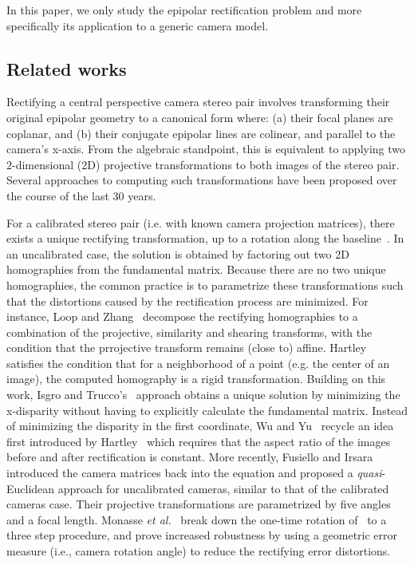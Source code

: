 \documentclass{ipol}
\begin{document}
\noindent In this paper, we only study  the epipolar rectification problem and more specifically
its application to a generic camera model.%

\subsection{Related works}
Rectifying a central perspective camera stereo pair involves transforming their original epipolar geometry to a canonical form where: (a) their focal planes are coplanar, and (b) their conjugate epipolar lines are colinear, and parallel to the camera's x-axis. 
From the algebraic standpoint, this is equivalent to applying two $2$-dimensional ($2$D) projective transformations to both images of the stereo pair. Several approaches to computing such transformations have been proposed over the course of the last 30 years.

For a calibrated stereo pair (i.e. with known camera projection matrices), there exists a unique rectifying transformation, up to a rotation along the baseline~\cite{fusiello2000epi}. In an uncalibrated case, the solution is obtained by factoring out two 2D homographies from the fundamental matrix. Because there are no two unique homographies, the common practice is to parametrize these transformations such that the distortions caused by the rectification process are minimized. For instance, Loop and Zhang~\cite{loop1999epi} decompose the rectifying homographies to a combination of the projective, similarity and shearing transforms, with the condition that the prrojective transform remains (close to) affine. Hartley~\cite{hartley1999epi} satisfies the condition that for a neighborhood of a point (e.g. the center of an image), the computed homography is a rigid transformation. Building on this work, Isgro and Trucco's~\cite{isgro1999epi} approach obtains a unique solution by minimizing the x-disparity without having to explicitly calculate the fundamental matrix. Instead of minimizing the disparity in the first coordinate, Wu and Yu~\cite{wu2005epi} recycle an idea first introduced by Hartley~\cite{hartley1999epi} which requires that the aspect ratio of the images before and after rectification is constant. More recently, Fusiello and Irsara~\cite{fusiello2008epi} introduced the camera matrices back into the equation and proposed a \textit{quasi}-Euclidean approach for uncalibrated cameras, similar to that of the calibrated cameras case. Their projective transformations are parametrized by five angles and a focal length. Monasse \textit{et al.}~\cite{monasse2010epi} break down the one-time rotation of~\cite{fusiello2008epi} to a three step procedure, and prove increased robustness by using a geometric error measure (i.e., camera rotation angle) to reduce the rectifying error distortions.
\end{document}
